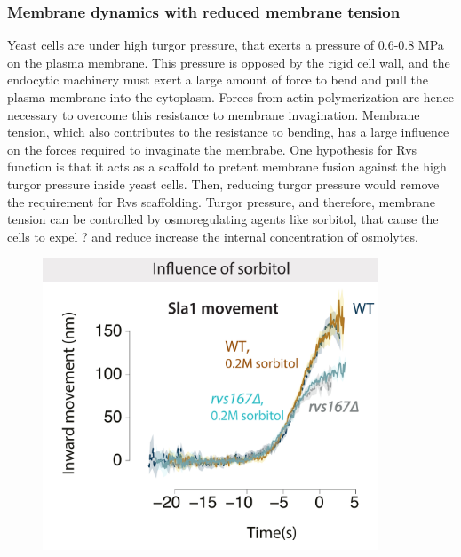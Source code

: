 	\subsubsection{Membrane dynamics with reduced membrane tension}
	
	Yeast cells are under high turgor pressure, that exerts a pressure of 0.6-0.8 MPa on the plasma membrane. This pressure is opposed by the rigid cell wall, and the endocytic machinery must exert a large amount of force to bend and pull the plasma membrane into the cytoplasm. Forces from actin polymerization are hence necessary to overcome this resistance to membrane invagination. Membrane tension, which also contributes to the resistance to bending, has a large influence on the forces required to invaginate the membrabe. One hypothesis for Rvs function is that it acts as a scaffold to pretent membrane fusion against the high turgor pressure inside yeast cells. Then, reducing turgor pressure would remove the requirement for Rvs scaffolding. Turgor pressure, and therefore, membrane tension can be controlled by osmoregulating agents like sorbitol, that cause the cells to expel ? and reduce increase the internal concentration of osmolytes. 
	
	
	
	\begin{figure}[H]
	\centering
	\includegraphics[width=10cm,height=10 cm,keepaspectratio]{figures/results_final/sorbitol}
	\end{figure}



